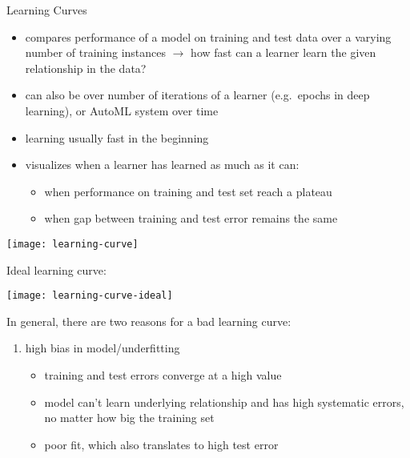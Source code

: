     \begin{frame}[c,allowframebreaks]{Learning Curves}

    \begin{itemize}
    \item compares performance of a model on training and test data over a varying number of training instances $\rightarrow$ how fast can a learner learn the given relationship in the data?
    \item can also be over number of iterations of a learner (e.g.\ epochs in
        deep learning), or AutoML system over time
    \item learning usually fast in the beginning
    \item visualizes when a learner has learned as much as it can:
    \begin{itemize}
    \item when performance on training and test set reach a plateau
    \item when gap between training and test error remains the same
    \end{itemize}
    \end{itemize}

    \begin{center}
    \texttt{[image: learning-curve]}
    \end{center}

    \framebreak

    Ideal learning curve:

    \begin{center}
    \texttt{[image: learning-curve-ideal]}
    \end{center}

    \framebreak

    In general, there are two reasons for a bad learning curve:

    \begin{enumerate}
    \item high bias in model/underfitting
    \begin{itemize}
    \item training and test errors converge at a high value
    \item model can't learn underlying relationship and has high systematic errors, no matter how big the training set
    \item poor fit, which also translates to high test error
    \end{itemize}


\end{enumerate}
\end{frame}
